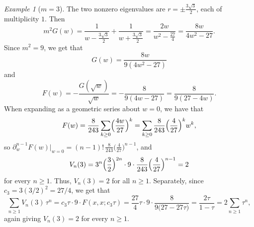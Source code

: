 \documentclass[11pt,reqno]{amsart}
\theoremstyle{remark}
\newtheorem{example}[theorem]{Example}
\begin{document}
\begin{example}[$m=3$]
\label{ex:m3}
The two nonzero eigenvalues are $r = \pm\frac{3\sqrt3}{2}$, each of multiplicity $1$. Then
\[
m^2 G(w) = \frac{1}{w - \tfrac{3\sqrt3}{2}} + \frac{1}{w+\tfrac{3\sqrt3}{2}}
= \frac{2w}{w^2 - \tfrac{27}{4}} = \frac{8w}{4w^2-27}.
\]
Since $m^2 = 9$, we get that
\[
G(w) = \frac{8w}{9(4w^2-27)}
\]
and
\[
F(w) = -\frac{G(\sqrt w)}{\sqrt w} = -\frac{8}{9(4w-27)} = \frac{8}{9(27-4w)}.
\]
When expanding as a geometric series about $w=0$, we have that
\[
F(w) = \frac{8}{243}\sum_{k\ge0}\Bigl(\frac{4w}{27}\Bigr)^k
= \sum_{k\ge0} \frac{8}{243}\Bigl(\frac{4}{27}\Bigr)^k w^k,
\]
so $\partial_w^{n-1}F(w)\big|_{w=0} = (n-1)!\,\frac{8}{243}\bigl(\tfrac{4}{27}\bigr)^{n-1}$, and
\[
V_n(3) = 3^n\Bigl(\frac{3}{2}\Bigr)^{2n}\cdot 9\cdot \frac{8}{243}\Bigl(\frac{4}{27}\Bigr)^{n-1} = 2
\]
for every $n \geq 1$.  Thus, $V_n(3) = 2$ for all $n \ge 1$.  Separately, since $c_3 = 3(3/2)^2 = 27/4$, we get that
\[
\sum_{n\ge1} V_n(3)\,\tau^n = c_3\tau\cdot 9\cdot F(x,x;c_3\tau)
= \frac{27}{4}\tau\cdot 9\cdot \frac{8}{9\bigl(27 - 27\tau\bigr)}
= \frac{2\tau}{1-\tau} = 2\sum_{n\ge1}\tau^n,
\]
again giving $V_n(3)=2$ for every $n\ge1$.
\end{example}

\end{document}
